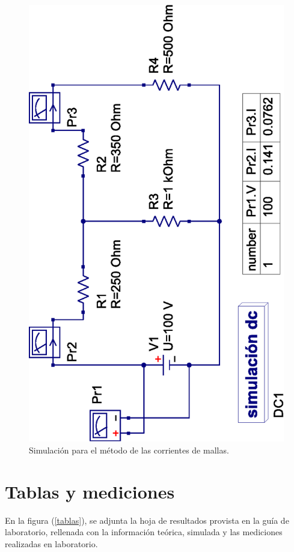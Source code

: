 \documentclass[letter,11pt]{article}
\begin{document}
\begin{figure}[!h]
\centering
\includegraphics[scale=0.88]{simulation/practica3.2.eps}
\caption{Simulación para el método de las corrientes de mallas.}
\label{simulacion2}
\end{figure}

\section{Tablas y mediciones}
En la figura (\ref{tablas}), se adjunta la hoja de resultados provista en la
guía de laboratorio, rellenada con la información teórica, simulada y las
mediciones realizadas en laboratorio.
\end{document}
